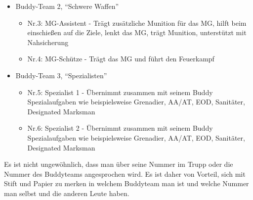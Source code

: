 		\begin{itemize}
			\item Buddy-Team 2, “Schwere Waffen” 
			\begin{itemize}
				\item Nr.3: MG-Assistent - Trägt zusätzliche Munition für das MG, hilft beim einschießen auf die Ziele, lenkt das MG, trägt Munition, unterstützt mit Nahsicherung
				\item Nr.4: MG-Schütze - Trägt das MG und führt den Feuerkampf
			\end{itemize}
		\end{itemize}

		\begin{itemize}
			\item Buddy-Team 3, “Spezialisten” 
			\begin{itemize} 
				\item Nr.5: Spezialist 1 - Übernimmt zusammen mit seinem Buddy Spezialaufgaben wie beispielsweise Grenadier, \ac{AA}/\ac{AT}, \ac{EOD}, Sanitäter, Designated Marksman
				\item Nr.6: Spezialist 2 - Übernimmt zusammen mit seinem Buddy Spezialaufgaben wie beispielsweise Grenadier, \ac{AA}/\ac{AT}, \ac{EOD}, Sanitäter, Designated Marksman
			\end{itemize}
		\end{itemize}
Es ist nicht ungewöhnlich, dass man über seine Nummer im Trupp oder die Nummer des Buddyteams angesprochen wird. Es ist daher von Vorteil, sich mit Stift und Papier zu merken in welchem Buddyteam man ist und welche Nummer man selbst und die anderen Leute haben.